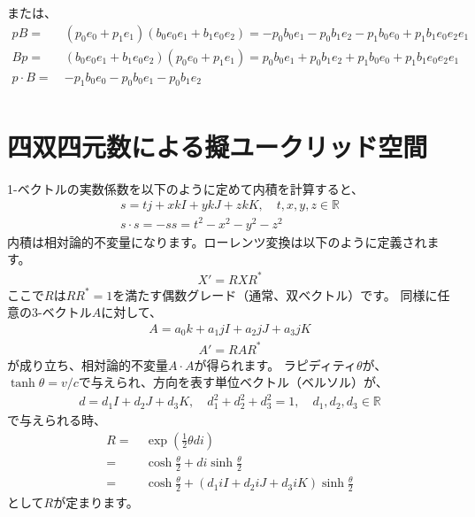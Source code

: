 \documentclass[a4paper,12pt,notitlepage]{jsreport}
\begin{document}
または、
\begin{equation}
  \begin{split}
    pB = ~ & (p_0 e_0 + p_1 e_1)(b_0 e_0e_1 + b_1 e_0e_2) = - p_0 b_0 e_1 - p_0 b_1 e_2 - p_1 b_0 e_0 + p_1 b_1 e_0e_2e_1 \\
    Bp = ~ & (b_0 e_0e_1 + b_1 e_0e_2)(p_0 e_0 + p_1 e_1) = p_0 b_0 e_1 + p_0 b_1 e_2 + p_1 b_0 e_0 + p_1 b_1 e_0e_2e_1 \\
    p \cdot B = ~ & - p_1 b_0 e_0 - p_0 b_0 e_1 - p_0 b_1 e_2 \\
  \end{split}
\end{equation}

\section{四双四元数による擬ユークリッド空間}

1-ベクトルの実数係数を以下のように定めて内積を計算すると、
\begin{gather}
  s = t j + x kI + y kJ + z kK, \quad t, x, y, z \in \mathbb{R} \\
  s \cdot s = - ss = t^2 - x^2 - y^2 - z^2
\end{gather}
内積は相対論的不変量になります。ローレンツ変換は以下のように定義されます。
\begin{gather}
  X'= R X R^*
\end{gather}
ここで$ R $は$ R R^* = 1 $を満たす偶数グレード（通常、双ベクトル）です。
同様に任意の3-ベクトル$ A $に対して、
\begin{gather}
  A = a_0 k + a_1 jI + a_2 jJ + a_3 jK
\end{gather}
\begin{gather}
  A' = R A R^*
\end{gather}
が成り立ち、相対論的不変量$ A \cdot A $が得られます。
ラピディティ$ \theta $が、$ \tanh \theta = v/c $で与えられ、方向を表す単位ベクトル（ベルソル）が、
\begin{gather}
  d=d_1I+d_2J+d_3K,\quad d_1^2+d_2^2+d_3^2=1,\quad d_1,d_2,d_3\in\mathbb{R}
\end{gather}
で与えられる時、
\begin{equation}
  \begin{split}
    R = ~ & \exp \left( \frac{1}{2} \theta d i \right) \\
    = ~ & \cosh \frac{\theta}{2} + d i \sinh \frac{\theta}{2} \\
    = ~ & \cosh \frac{\theta}{2} + (d_1 iI + d_2 iJ + d_3 iK) \sinh \frac{\theta}{2}
  \end{split}
\end{equation}
として$ R $が定まります。
\end{document}
